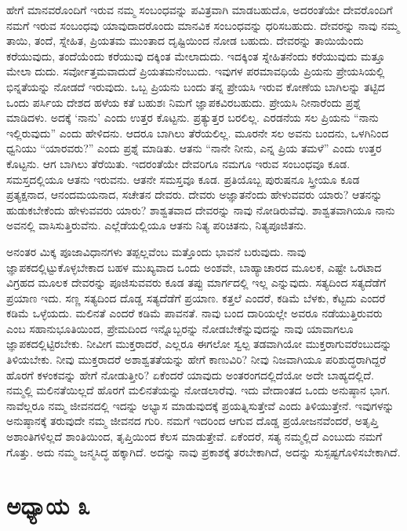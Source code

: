 ಹೇಗೆ ಮಾನವರೊಂದಿಗೆ ಇರುವ ನಮ್ಮ ಸಂಬಂಧವನ್ನು ಪವಿತ್ರವಾಗಿ ಮಾಡಬಹುದೊ, ಅದರಂತೆಯೇ ದೇವರೊಂದಿಗೆ ನಮಗೆ ಇರುವ ಸಂಬಂಧವು ಯಾವುದಾದರೊಂದು ಮಾನವಿಕ ಸಂಬಂಧವನ್ನು ಧರಿಸಬಹುದು. ದೇವರನ್ನು ನಾವು ನಮ್ಮ ತಾಯಿ, ತಂದೆ, ಸ್ನೇಹಿತ, ಪ್ರಿಯತಮ ಮುಂತಾದ ದೃಷ್ಟಿಯಿಂದ ನೋಡ ಬಹುದು. ದೇವರನ್ನು ತಾಯಿಯೆಂದು ಕರೆಯುವುದು, ತಂದೆಯೆಂದು ಕರೆಯುವು ದಕ್ಕಿಂತ ಮೇಲಾದುದು. ಇದಕ್ಕಿಂತ ಸ್ನೇಹಿತನೆಂದು ಕರೆಯುವುದು ಮತ್ತೂ ಮೇಲಾ ದುದು. ಸರ್ವೋತ್ತಮವಾದುದೆ ಪ್ರಿಯತಮನೆಂಬುದು. ಇವುಗಳ ಪರಮಾವಧಿಯೆ ಪ್ರಿಯನು ಪ್ರೇಯಸಿಯಲ್ಲಿ ಭಿನ್ನತೆಯನ್ನು ನೋಡದೆ ಇರುವುದು. ಒಬ್ಬ ಪ್ರಿಯನು ಬಂದು ತನ್ನ ಪ್ರೇಯಸಿ ಇರುವ ಕೋಣೆಯ ಬಾಗಿಲನ್ನು ತಟ್ಟಿದ ಒಂದು ಪರ್ಸಿಯ ದೇಶದ ಹಳೆಯ ಕತೆ ಬಹುಶಃ ನಿಮಗೆ ಜ್ಞಾಪಕವಿರಬಹುದು. ಪ್ರೇಯಸಿ ನೀನಾರೆಂದು ಪ್ರಶ್ನೆ ಮಾಡಿದಳು. ಅದಕ್ಕೆ ‘ನಾನು’ ಎಂದು ಉತ್ತರ ಕೊಟ್ಟನು. ಪ್ರತ್ಯುತ್ತರ ಬರಲಿಲ್ಲ. ಎರಡನೆಯ ಸಲ ಪ್ರಿಯನು “ನಾನು ಇಲ್ಲಿರುವುದು” ಎಂದು ಹೇಳಿದನು. ಆದರೂ ಬಾಗಿಲು ತೆರೆಯಲಿಲ್ಲ. ಮೂರನೇ ಸಲ ಅವನು ಬಂದನು, ಒಳಗಿನಿಂದ ಧ್ವನಿಯು “ಯಾರವರು?” ಎಂದು ಪ್ರಶ್ನೆ ಮಾಡಿತು. ಆತನು “ನಾನೇ ನೀನು, ಎನ್ನ ಪ್ರಿಯ ತಮಳೆ” ಎಂದು ಉತ್ತರ ಕೊಟ್ಟನು. ಆಗ ಬಾಗಿಲು ತೆರೆಯಿತು. ಇದರಂತೆಯೇ ದೇವರಿಗೂ ನಮಗೂ ಇರುವ ಸಂಬಂಧವೂ ಕೂಡ. ಸಮಸ್ತದಲ್ಲಿಯೂ ಆತನು ಇರುವನು. ಆತನೇ ಸಮಸ್ತವೂ ಕೂಡ. ಪ್ರತಿಯೊಬ್ಬ ಪುರುಷನೂ ಸ್ತ್ರೀಯೂ ಕೂಡ ಪ್ರತ್ಯಕ್ಷನಾದ, ಆನಂದಮಯನಾದ, ಸಚೇತನ ದೇವರು. ದೇವರು ಅಜ್ಞಾತನೆಂದು ಹೇಳುವವರು ಯಾರು? ಆತನನ್ನು ಹುಡುಕಬೇಕೆಂದು ಹೇಳುವವರು ಯಾರು? ಶಾಶ್ವತವಾದ ದೇವರನ್ನು ನಾವು ನೋಡಿರುವೆವು. ಶಾಶ್ವತವಾಗಿಯೂ ನಾನು ಅವನಲ್ಲಿ ವಾಸಿಸುತ್ತಿರುವೆನು. ಎಲ್ಲೆಡೆಯಲ್ಲಿಯೂ ಆತನು ನಿತ್ಯ ಪರಿಚಿತನು, ನಿತ್ಯಪೂಜಿತನು.

ಅನಂತರ ಮಿಕ್ಕ ಪೂಜಾವಿಧಾನಗಳು ತಪ್ಪಲ್ಲವೆಂಬ ಮತ್ತೊಂದು ಭಾವನೆ ಬರುವುದು. ನಾವು ಜ್ಞಾಪಕದಲ್ಲಿಟ್ಟುಕೊಳ್ಳಬೇಕಾದ ಬಹಳ ಮುಖ್ಯವಾದ ಒಂದು ಅಂಶವೇ, ಬಾಹ್ಯಾಚಾರದ ಮೂಲಕ, ಎಷ್ಟೇ ಒರಟಾದ ವಿಗ್ರಹದ ಮೂಲಕ ದೇವರನ್ನು ಪೂಜಿಸುವವರು ಕೂಡ ತಪ್ಪು ಮಾರ್ಗದಲ್ಲಿ ಇಲ್ಲ ಎನ್ನುವುದು. ಸತ್ಯದಿಂದ ಸತ್ಯದೆಡೆಗೆ ಪ್ರಯಾಣ ಇದು. ಸಣ್ಣ ಸತ್ಯದಿಂದ ದೊಡ್ಡ ಸತ್ಯದೆಡೆಗೆ ಪ್ರಯಾಣ. ಕತ್ತಲೆ ಎಂದರೆ, ಕಡಿಮೆ ಬೆಳಕು, ಕೆಟ್ಟದು ಎಂದರೆ ಕಡಿಮೆ ಒಳ್ಳೆಯದು. ಮಲಿನತೆ ಎಂದರೆ ಕಡಿಮೆ ಪಾವನತೆ. ನಾವು ಬಂದ ದಾರಿಯಲ್ಲೇ ಅವರೂ ನಡೆಯುತ್ತಿರುವರು ಎಂಬ ಸಹಾನುಭೂತಿಯಿಂದ, ಪ್ರೇಮದಿಂದ ಇನ್ನೊಬ್ಬರನ್ನು ನೋಡಬೇಕೆನ್ನುವುದನ್ನು ನಾವು ಯಾವಾಗಲೂ ಜ್ಞಾಪಕದಲ್ಲಿಟ್ಟಿರಬೇಕು. ನೀವೀಗ ಮುಕ್ತರಾದರೆ, ಎಲ್ಲರೂ ಈಗಲೋ ಸ್ವಲ್ಪ ತಡವಾಗಿಯೋ ಮುಕ್ತರಾಗುವರೆಂಬುದನ್ನು ತಿಳಿಯಬೇಕು. ನೀವು ಮುಕ್ತರಾದರೆ ಅಶಾಶ್ವತತೆಯನ್ನು ಹೇಗೆ ಕಾಣುವಿರಿ? ನೀವು ನಿಜವಾಗಿಯೂ ಪರಿಶುದ್ಧರಾಗಿದ್ದರೆ ಹೊರಗೆ ಕಳಂಕವನ್ನು ಹೇಗೆ ನೋಡುತ್ತೀರಿ? ಏಕೆಂದರೆ ಯಾವುದು ಅಂತರಂಗದಲ್ಲಿದೆಯೋ ಅದೇ ಬಾಹ್ಯದಲ್ಲಿದೆ. ನಮ್ಮಲ್ಲಿ ಮಲಿನತೆಯಿಲ್ಲದೆ ಹೊರಗೆ ಮಲಿನತೆಯನ್ನು ನೋಡಲಾರೆವು. ಇದು ವೇದಾಂತದ ಒಂದು ಅನುಷ್ಠಾನ ಭಾಗ. ನಾವೆಲ್ಲರೂ ನಮ್ಮ ಜೀವನದಲ್ಲಿ ಇದನ್ನು ಅಭ್ಯಾಸ ಮಾಡುವುದಕ್ಕೆ ಪ್ರಯತ್ನಿಸುತ್ತೇವೆ ಎಂದು ತಿಳಿಯುತ್ತೇನೆ. ಇವುಗಳನ್ನು ಅನುಷ್ಠಾನಕ್ಕೆ ತರುವುದೇ ನಮ್ಮ ಜೀವನದ ಗುರಿ. ನಮಗೆ ಇದರಿಂದ ಆಗುವ ದೊಡ್ಡ ಪ್ರಯೋಜನವೆಂದರೆ, ಅತೃಪ್ತಿ ಅಶಾಂತಿಗಳಿಲ್ಲದೆ ಶಾಂತಿಯಿಂದ, ತೃಪ್ತಿಯಿಂದ ಕೆಲಸ ಮಾಡುತ್ತೇವೆ. ಏಕೆಂದರೆ, ಸತ್ಯ ನಮ್ಮಲ್ಲಿದೆ ಎಂಬುದು ನಮಗೆ ಗೊತ್ತು. ಅದು ನಮ್ಮ ಜನ್ಮಸಿದ್ಧ ಹಕ್ಕಾಗಿದೆ. ಅದನ್ನು ನಾವು ಪ್ರಕಾಶಕ್ಕೆ ತರಬೇಕಾಗಿದೆ, ಅದನ್ನು ಸುಸ್ಪಷ್ಟಗೊಳಿಸಬೇಕಾಗಿದೆ.

\chapter{ಅಧ್ಯಾಯ ೩}

